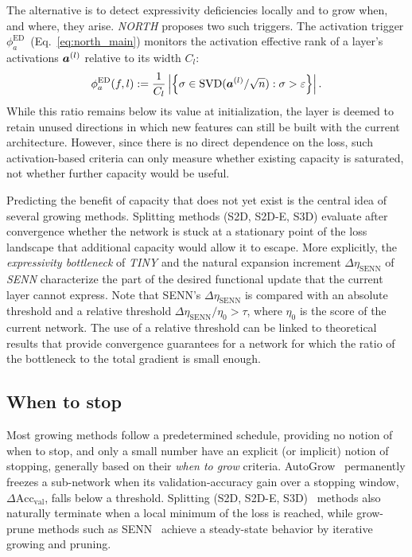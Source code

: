 The alternative is to detect expressivity deficiencies locally and to grow when,
and where, they arise. \emph{NORTH} \citep{maile_when_2022} proposes two
such triggers. The activation trigger $\phi_a^{\mathrm{ED}}$~(Eq.~\ref{eq:north_main}) monitors the activation effective rank of a layer's
activations $\Postact[l]$ relative to its width $C_l$:
\begin{equation}\label{eq:north_main}
\phi_a^{\mathrm{ED}}(f,l)
:= \frac{1}{C_l}
\left|\left\{\sigma\in\operatorname{SVD}(\Postact[l]/\sqrt n):
\sigma>\varepsilon\right\}\right|.
\end{equation}
While this ratio remains below its value at
initialization, the layer is deemed to retain unused directions in which new
features can still be built with the current architecture. However, since there is no direct dependence on the loss, such activation-based criteria can only measure whether existing capacity is saturated, not whether further capacity would be useful.

Predicting the benefit of capacity that does not yet exist is the central idea of several growing methods. Splitting methods (S2D, S2D-E, S3D) \citep{liu_splitting_2019,wang_energy-aware_2020,wu_steepest_2021} evaluate after convergence whether the network is stuck at a stationary point of the loss landscape that additional capacity would allow it to escape. More explicitly, the \emph{expressivity bottleneck} of \emph{TINY}
\citep{verbockhaven_growing_2024} and the natural expansion increment
$\Delta\eta_{\mathrm{SENN}}$ of \emph{SENN} \citep{mitchell_self-expanding_2024} characterize
the part of the desired functional update that the current layer cannot
express. Note that SENN's $\Delta\eta_{\mathrm{SENN}}$ is compared with an absolute threshold and a relative threshold $\Delta\eta_{\mathrm{SENN}}/\eta_0 > \tau$, where $\eta_0$ is the score of the current network. The use of a relative threshold can be linked to theoretical results \citep{csillagFunctionalGradientDescent2026} that provide convergence guarantees for a network for which the ratio of the bottleneck to the total gradient is small enough.

\subsection{When to stop}

Most growing methods follow a predetermined schedule, providing no notion of when to stop, and only a small number have an explicit (or implicit) notion of stopping, generally based on their \emph{when to grow} criteria. AutoGrow~\citep{wen_autogrow_2020} permanently freezes a sub-network when its validation-accuracy gain over a stopping window, $\Delta\mathrm{Acc}_{\mathrm{val}}$, falls below a threshold. Splitting (S2D, S2D-E, S3D)~\citep{liu_splitting_2019,wang_energy-aware_2020,wu_steepest_2021} methods also naturally terminate when a local minimum of the loss is reached, while grow-prune methods such as SENN~\citep{mitchell_self-expanding_2024} achieve a steady-state behavior by iterative growing and pruning.
